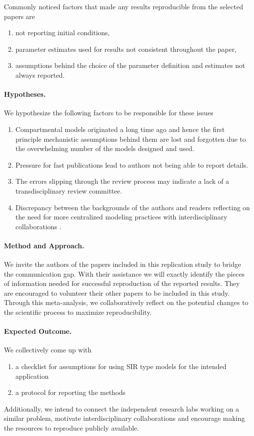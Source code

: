 \documentclass{article}
\begin{document}
Commonly noticed factors that made any results reproducible from the selected papers are
\begin{enumerate}
    \item not reporting initial conditions,
    \item parameter estimates used for results not consistent throughout the paper, 
    \item assumptions behind the choice of the parameter definition and estimates not always reported.
\end{enumerate}

\paragraph{Hypotheses.}
We hypothesize the following factors to be responsible for these issues
\begin{enumerate}
    \item Compartmental models originated a long time ago and hence the first principle mechanistic assumptions behind them are lost and forgotten due to the overwhelming number of the models designed and used.
    \item Pressure for fast publications lead to authors not being able to report details.
    \item The errors slipping through the review process may indicate a lack of a transdisciplinary review committee.
    \item Discrepancy between the backgrounds of the authors and readers reflecting on the need for more centralized modeling practices with interdisciplinary collaborations \cite{kretzschmar2020disease}.
\end{enumerate}

\paragraph{Method and Approach.} We invite the authors of the papers included in this replication study to bridge the communication gap. With their assistance we will exactly identify the pieces of information needed for successful reproduction of the reported results. They are encouraged to volunteer their other papers to be included in this study. Through this meta-analysis, we collaboratively reflect on the potential changes to the scientific process to maximize reproducibility.


\paragraph{Expected Outcome.} We collectively come up with 
\begin{enumerate}
    \item a checklist for assumptions for using SIR type models for the intended application
    \item a protocol for reporting the methods
\end{enumerate}
Additionally, we intend to connect the independent research labs working on a similar problem, motivate interdisciplinary collaborations and encourage making the resources to reproduce publicly available.
\end{document}
